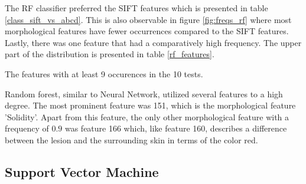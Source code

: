 \documentclass{kththesis}
\begin{document}
The RF classifier preferred the SIFT features which is presented in table \ref{class_sift_vs_abcd}. This is also observable in figure \ref{fig:freqs_rf} where most morphological features have fewer occurrences compared to the SIFT features. Lastly, there was one feature that had a comparatively high frequency. The upper part of the distribution is presented in table \ref{rf_features}.

\newpage

\begin{table}[h!]
  \caption{The features with at least 9 occurences in the 10 tests.}
  \begin{center}
  \end{center}
  \label{rf_features}
\end{table}

Random forest, similar to Neural Network, utilized several features to a high degree. The most prominent feature was 151, which is the morphological feature 'Solidity'. Apart from this feature, the only other morphological feature with a frequency of $0.9$ was feature 166 which, like feature 160, describes a difference between the lesion and the surrounding skin in terms of the color red.


\newpage

\subsection{Support Vector Machine}
\end{document}
